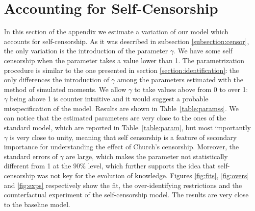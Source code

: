 \documentclass[12pt]{article}
\begin{document}
\section{Accounting for Self-Censorship}\label{appendix:b}
In this section of the appendix we estimate a variation of our model which accounts for self-censorship. As it was described in subsection \ref{subsection:censor}, the only variation is the introduction of the parameter $\gamma$. We have some self censorship when the parameter takes a value lower than 1. The parametrization procedure is similar to the one presented in section \ref{section:identification}: the only differences the introduction of $\gamma$ among the parameters estimated with the method of simulated moments. We allow $\gamma$ to take values above from 0 to over 1: $\gamma$ being above 1 is counter intuitive and it would suggest a probable misspecification of the model.  Results are shown in Table~\ref{table:paramss}. We can notice that the estimated parameters are very close to the ones of the standard model, which are reported in Table~\ref{table:param}, but most importantly $\gamma$ is very close to unity, meaning that self censorship is a feature of secondary importance for understanding the effect of Church's censorship. Moreover, the standard errors of $\gamma$ are large, which makes the parameter not statistically different from 1 at the $90\%$ level, which further supports the idea that self-censorship was not key for the evolution of knowledge. Figures \ref{fig:fits}, \ref{fig:overs} and \ref{fig:exps} respectively show the fit, the over-identifying restrictions and the counterfactual experiment of the self-censorship model. The results are very close to the baseline model.
\end{document}
